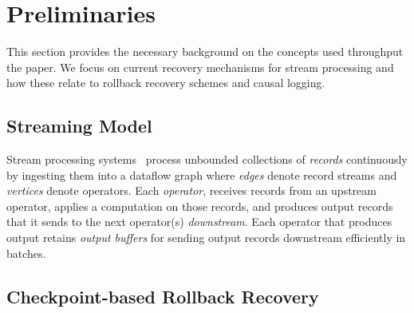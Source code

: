 \documentclass[sigconf]{acmart}
\newcounter{AsteriosNOC}
\newcommand{\asterios}[1]{\noindent\textcolor{purple}{\small \bf [Asterios\#\arabic{AsteriosNOC}\stepcounter{AsteriosNOC}: #1]}}
\begin{document}
\section{Preliminaries}
\label{sec:background}

This section provides the necessary background on the concepts used throughput the paper. We focus on current recovery mechanisms for stream processing and how these relate to rollback recovery schemes and causal logging.




\subsection{Streaming Model}
Stream processing systems~\cite{akidau2013millwheel, CarboneKE15, SilvaZD16, NoghabiPP17} process unbounded collections of \textit{records} continuously by ingesting them into a dataflow graph where \textit{edges} denote record streams and \textit{vertices} denote operators.
Each \textit{operator}, receives records from an upstream operator, applies a computation on those records, and produces  output records that it sends to the next operator(s) \textit{downstream}. Each operator that produces output retains \textit{output buffers} for sending output records downstream efficiently in batches.



\subsection{Checkpoint-based Rollback Recovery}
\end{document}
